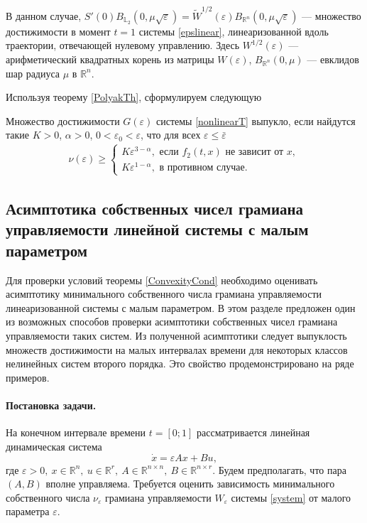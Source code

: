 \documentclass[../main.tex]{subfiles}
\begin{document}
   В данном случае, $S'(0)B_{\mathbb{L}_2}(0,\mu\sqrt{\varepsilon}) = \widetilde{W}^{1/2}(\varepsilon)B_{\mathbb{R}^n}(0,\mu\sqrt{\varepsilon}) $ --- множество достижимости в момент $t = 1$ системы \eqref{epslinear}, линеаризованной вдоль траектории, отвечающей нулевому управлению. Здесь $W^{1/2}(\varepsilon)$ --- арифметический квадратных корень из матрицы $W(\varepsilon)$, $ B_{\mathbb{R}^n}(0,\mu) $ --- евклидов шар радиуса $ \mu $ в $ \mathbb{R}^n $.
 
 Используя теорему \ref{PolyakTh}, сформулируем следующую
 \begin{theorem}\label{ConvexityCond}
 	Множество достижимости $G(\varepsilon)$ системы \eqref{nonlinearT} выпукло, если найдутся такие $K > 0$, $ \alpha > 0$, $ 0 < \varepsilon_0 < \varepsilon$, что для всех $\varepsilon \leqslant \bar{\varepsilon}$
 		\begin{gather}\label{cond}
 			\nu(\varepsilon) \geqslant \left\{ {\begin{array}{*{20}{l}}
 					{K\varepsilon ^{3 - \alpha}, \mbox{\ если \ } f_2(t,x) \mbox{\ не зависит от \ } x}, \\
 					{K\varepsilon ^{1 - \alpha}}, \mbox{\ в противном случае}.
 			\end{array}} \right.
 		\end{gather}
 \end{theorem}
 
 \subsection{Асимптотика собственных чисел грамиана управляемости линейной системы с малым параметром} 
 Для проверки условий теоремы \ref{ConvexityCond} необходимо оценивать асимптотику минимального собственного числа грамиана управляемости линеаризованной системы с малым параметром. В этом разделе предложен один из возможных способов проверки асимптотики собственных чисел грамиана управляемости таких систем. Из полученной асимптотики следует выпуклость множеств достижимости на малых интервалах времени для некоторых классов нелинейных систем второго порядка. Это свойство продемонстрировано на ряде примеров.
 \paragraph{Постановка задачи.} На конечном интервале времени $ t = [0;1] $ рассматривается линейная динамическая система 
 \begin{equation}\label{system}
	 \dot{x} = \varepsilon A x + Bu, 
 \end{equation}
 где $ \varepsilon > 0, \ x \in \mathbb{R}^n, \ u \in \mathbb{R}^r, \ A \in \mathbb{R}^{n\times n}, \ B \in \mathbb{R}^{n\times r}  $. Будем предполагать, что пара $ \left( A, B\right)  $ вполне управляема. Требуется оценить зависимость минимального собственного числа $ \nu_{\varepsilon} $ грамиана управляемости $ W_{\varepsilon} $ системы \eqref{system} от малого параметра $ \varepsilon  $.
\end{document}
